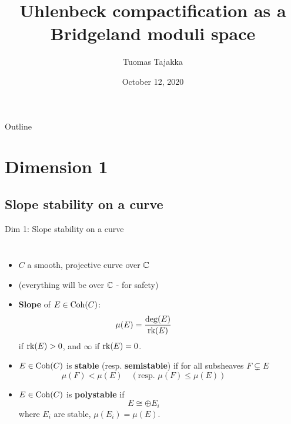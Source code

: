 \documentclass[8pt,handout]{beamer} %
\title{Uhlenbeck compactification as a Bridgeland moduli space}
\author{Tuomas Tajakka}
\institute{University of Washington}
\date{October 12, 2020}
\begin{document}
\begin{frame}
    \titlepage
\end{frame}

\begin{frame}{Outline}
    \tableofcontents    
\end{frame}

\section{Dimension 1}
\subsection{Slope stability on a curve}
\begin{frame}[fragile]{Dim 1: Slope stability on a curve}
\begin{columns}[t]
    \begin{itemize}
        \item<2-> $C$ a smooth, projective curve over $\mathbb{C}$
        \item<3-> (everything will be over $\mathbb{C}$ - for safety)
        \item<4-> \textbf{Slope} of $E \in \mathrm{Coh}(C)$:
        \[ \mu(E) = \frac{\deg(E)}{\operatorname{\mathrm{rk}}(E)} \]
        if $\operatorname{\mathrm{rk}}(E) > 0$, and $\infty$ if $\operatorname{\mathrm{rk}}(E) = 0$.
        \item<5-> $E \in \mathrm{Coh}(C)$ is \textbf{stable} (resp. \textbf{semistable}) if for all subsheaves $F \subsetneq E$
        \[ \mu(F) < \mu(E) \quad (\text{resp. } \mu(F) \le \mu(E)) \]
        \item<6-> $E \in \mathrm{Coh}(C)$ is \textbf{polystable} if
        \[ E \cong \oplus E_i \]
        where $E_i$ are stable, $\mu(E_i) = \mu(E)$.
    \end{itemize}
    

\end{columns}
\end{frame}
\end{document}
